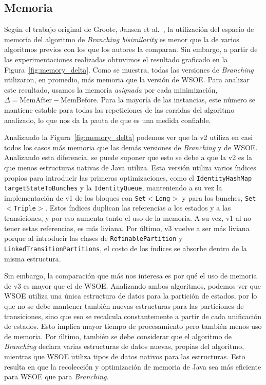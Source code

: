 \subsection{Memoria}
Según el trabajo original de Groote, Jansen et al.~\cite{groote2019}, la utilización del espacio de memoria del algoritmo de \textit{Branching bisimilarity} es menor que la de varios algoritmos previos con los que los autores la comparan. Sin embargo, a partir de las experimentaciones realizadas obtuvimos el resultado graficado en la Figura~\ref{fig:memory_delta}. Como se muestra, todas las versiones de \textit{Branching} utilizaron, en promedio, más memoria que la versión de WSOE. Para analizar este resultado, usamos la memoria \textit{asignada} por cada minimización, $\Delta = \text{MemAfter} - \text{MemBefore}$. Para la mayoría de las instancias, este número se mantiene estable para todas las repeticiones de las corridas del algoritmo analizado, lo que nos da la pauta de que es una medida confiable.

Analizando la Figura~\ref{fig:memory_delta} podemos ver que la v2 utiliza en casi todos los casos más memoria que las demás versiones de \textit{Branching} y de WSOE. Analizando esta diferencia, se puede suponer que esto se debe a que la v2 es la que menos estructuras nativas de Java utiliza. Esta versión utiliza varios índices propios para introducir las primeras optimizaciones, como el \texttt{IdentityHashMap} \texttt{targetStateToBunches} y la \texttt{IdentityQueue}, manteniendo a su vez la implementación de v1 de los bloques con \texttt{Set$<$Long$>$} y para los bunches, \texttt{Set$<$Triple$>$}.  Estos índices duplican las referencias a los estados y a las transiciones, y por eso aumenta tanto el uso de la memoria. A su vez, v1 al no tener estas referencias, es más liviana. Por último, v3 vuelve a ser más liviana porque al introducir las clases de \texttt{RefinablePartition} y \texttt{LinkedTransitionPartitions}, el costo de los índices se absorbe dentro de la misma estructura.

Sin embargo, la comparación que más nos interesa es por qué el uso de memoria de v3 es mayor que el de WSOE. Analizando ambos algoritmos, podemos ver que WSOE utiliza una única estructura de datos para la partición de estados, por lo que no se debe mantener también nuevas estructuras para las particiones de transiciones, sino que eso se recalcula constantemente a partir de cada unificación de estados. Esto implica mayor tiempo de procesamiento pero también menos uso de memoria. Por último, también se debe considerar que el algoritmo de \textit{Branching} declara varias estructuras de datos nuevas, propias del algoritmo, mientras que WSOE utiliza tipos de datos nativos para las estructuras. Esto resulta en que la recolección y optimización de memoria de Java sea más eficiente para WSOE que para \textit{Branching}.

